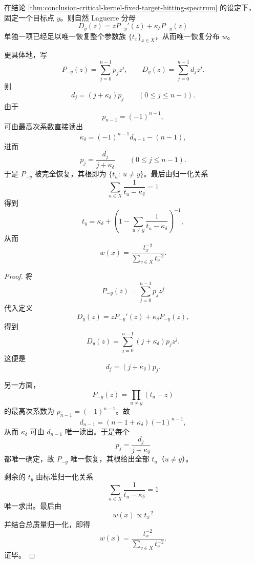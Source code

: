 \begin{theorem}[单一目标分母的完全逆问题]\label{thm:conclusion-critical-kernel-one-target-denominator-reconstruction}
在结论 \ref{thm:conclusion-critical-kernel-fixed-target-hitting-spectrum} 的设定下，固定一个目标点 \(y\)。则自然 Laguerre 分母
\[
D_y(z)=zP_{-y}'(z)+\kappa_\delta P_{-y}(z)
\]
单独一项已经足以唯一恢复整个参数族 \(\{t_x\}_{x\in X}\)，从而唯一恢复分布 \(w\)。

更具体地，写
\[
P_{-y}(z)=\sum_{j=0}^{n-1}p_j z^j,
\qquad
D_y(z)=\sum_{j=0}^{n-1}d_j z^j.
\]
则
\[
d_j=(j+\kappa_\delta)p_j\qquad(0\le j\le n-1).
\]
由于
\[
p_{n-1}=(-1)^{n-1},
\]
可由最高次系数直接读出
\[
\kappa_\delta=(-1)^{n-1}d_{n-1}-(n-1),
\]
进而
\[
p_j=\frac{d_j}{j+\kappa_\delta}\qquad(0\le j\le n-1).
\]
于是 \(P_{-y}\) 被完全恢复，其根即为 \(\{t_u:\ u\ne y\}\)。最后由归一化关系
\[
\sum_{u\in X}\frac1{t_u-\kappa_\delta}=1
\]
得到
\[
t_y
=
\kappa_\delta+\left(1-\sum_{u\ne y}\frac1{t_u-\kappa_\delta}\right)^{-1},
\]
从而
\[
w(x)=\frac{t_x^{-2}}{\sum_{v\in X}t_v^{-2}}.
\]
\end{theorem}
\begin{proof}
将
\[
P_{-y}(z)=\sum_{j=0}^{n-1}p_j z^j
\]
代入定义
\[
D_y(z)=zP_{-y}'(z)+\kappa_\delta P_{-y}(z),
\]
得到
\[
D_y(z)=\sum_{j=0}^{n-1}(j+\kappa_\delta)p_j z^j.
\]
这便是
\[
d_j=(j+\kappa_\delta)p_j.
\]

另一方面，
\[
P_{-y}(z)=\prod_{u\ne y}(t_u-z)
\]
的最高次系数为 \(p_{n-1}=(-1)^{n-1}\)。故
\[
d_{n-1}=(n-1+\kappa_\delta)(-1)^{n-1},
\]
从而 \(\kappa_\delta\) 可由 \(d_{n-1}\) 唯一读出。于是每个
\[
p_j=\frac{d_j}{j+\kappa_\delta}
\]
都唯一确定，故 \(P_{-y}\) 唯一恢复，其根给出全部 \(t_u\)（\(u\ne y\)）。

剩余的 \(t_y\) 由标准归一化关系
\[
\sum_{u\in X}\frac1{t_u-\kappa_\delta}=1
\]
唯一求出。最后由
\[
w(x)\propto t_x^{-2}
\]
并结合总质量归一化，即得
\[
w(x)=\frac{t_x^{-2}}{\sum_{v\in X}t_v^{-2}}.
\]
证毕。
\end{proof}

